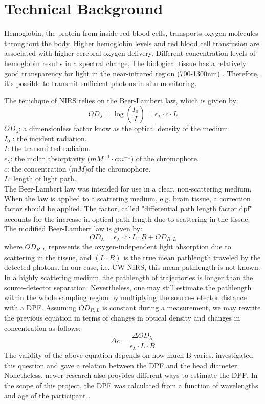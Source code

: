 \section{Technical Background}
Hemoglobin, the protein from inside red blood cells, transports oxygen molecules throughout the body. Higher hemoglobin levels and red blood cell transfusion are associated with higher cerebral oxygen delivery. Different concentration levels of hemoglobin results in a spectral change. The biological tissue has a relatively good transparency for light in the near-infrared region (700-1300nm) \cite{doi:10.1126/science.929199}. Therefore, it's possible to transmit sufficient photons in situ monitoring. 

The tenichque of NIRS relies on the Beer-Lambert law, which is givien by:
\[
OD_{\lambda} = \log \left(\frac {I_0}{I}\right) = \epsilon _{\lambda} \cdot c \cdot L
\]
$OD_{\lambda} $: a dimensionless factor know as the optical density of the medium.  \\
$I_0$ : the incident radiation. \\
$I$: the transmitted radiaion. \\
$\epsilon _{\lambda}$: the molar absorptivity ($mM^{-1} \cdot cm^{-1}$) of the chromophore. \\
$c$: the concentration ($mM$)of the chromophore. \\
$L$: length of light path. \\

The Beer-Lambert law was intended for use in a clear, non-scattering medium. When the law is applied to a scattering medium, e.g. brain tissue, a correction factor should be applied. The factor, called "differential path length factor \acrshort{dpf}" accounts for the increase in optical path length due to scattering in the tissue. The modified Beer-Lambert law is given by:
\[
OD_{\lambda} = \epsilon _{\lambda} \cdot c \cdot L \cdot B + OD_{R,L}
\]
where $OD_{R,L}$ represents the oxygen-independent light absorption due to scattering in the tissue, and $(L \cdot B)$ is the true mean pathlength traveled by the detected photons. In our case, i.e. CW-NIRS, this mean pathlength is not known. In a highly scattering medium, the pathlength of trajectories is longer than the source-detector separation. Nevertheless, one may still estimate the pathlength within the whole sampling region by multiplying the source-detector distance with a DPF. Assuming $OD_{R,L}$ is constant during a measurement, we may rewrite the previous equation in terms of changes in optical density and changes in concentration as follows:
\[
\Delta c =\frac { \Delta OD_{\lambda}} {\epsilon _{\lambda} \cdot L \cdot B}
\]
The validity of the above equation depends on how much B varies. \cite {Delpy_1988} investigated this question and gave a relation between the DPF and the head diameter. Nonetheless, newer research also provides different ways to estimate the DPF. In the scope of this project, the DPF was calculated from a function of wavelengths and age of the participant \cite {Duncan1996MeasurementOC}.



